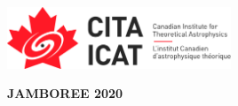 \documentclass[11pt,letterpaper]{article}
\begin{document}
\begin{multicols}{2}
\null\vfill
\includegraphics[width=0.5\textwidth]{header/CITA_FullColour_Horizontal}
\vfill\null
\columnbreak
\null\vfill
\begin{center}
  {\bf\huge JAMBOREE 2020}
\end{center}
\vfill\null
\end{multicols}
\end{document}
